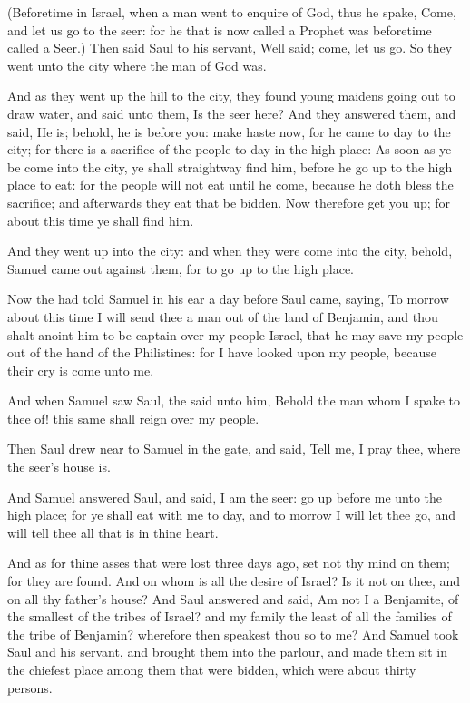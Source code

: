\verse (Beforetime in Israel, when a man went to enquire of God, thus he spake, Come, and let us go to the seer: for he that is now called a Prophet was beforetime called a Seer.)  \verse Then said Saul to his servant, Well said; come, let us go. So they went unto the city where the man of God was.

\verse And as they went up the hill to the city, they found young maidens going out to draw water, and said unto them, Is the seer here?  \verse And they answered them, and said, He is; behold, he is before you: make haste now, for he came to day to the city; for there is a sacrifice of the people to day in the high place: \verse As soon as ye be come into the city, ye shall straightway find him, before he go up to the high place to eat: for the people will not eat until he come, because he doth bless the sacrifice; and afterwards they eat that be bidden. Now therefore get you up; for about this time ye shall find him.

\verse And they went up into the city: and when they were come into the city, behold, Samuel came out against them, for to go up to the high place.

\verse Now the \LORD had told Samuel in his ear a day before Saul came, saying, \verse To morrow about this time I will send thee a man out of the land of Benjamin, and thou shalt anoint him to be captain over my people Israel, that he may save my people out of the hand of the Philistines: for I have looked upon my people, because their cry is come unto me.

\verse And when Samuel saw Saul, the \LORD said unto him, Behold the man whom I spake to thee of! this same shall reign over my people.

\verse Then Saul drew near to Samuel in the gate, and said, Tell me, I pray thee, where the seer's house is.

\verse And Samuel answered Saul, and said, I am the seer: go up before me unto the high place; for ye shall eat with me to day, and to morrow I will let thee go, and will tell thee all that is in thine heart.

\verse And as for thine asses that were lost three days ago, set not thy mind on them; for they are found. And on whom is all the desire of Israel? Is it not on thee, and on all thy father's house?  \verse And Saul answered and said, Am not I a Benjamite, of the smallest of the tribes of Israel? and my family the least of all the families of the tribe of Benjamin? wherefore then speakest thou so to me?  \verse And Samuel took Saul and his servant, and brought them into the parlour, and made them sit in the chiefest place among them that were bidden, which were about thirty persons.

